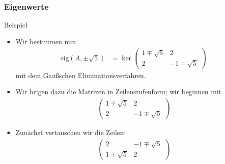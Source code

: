 \documentclass{beamer}
\renewcommand{\ae}{\"a}
\newcommand{\eig}{\mathrm{eig}}
\newcommand{\mytitle}{Eigenwerte}
\begin{document}
\begin{frame}\frametitle{\mytitle}
	\begin{block}{Beispiel}
	\begin{itemize}
		\item Wir bestimmen nun
			\begin{align*}
				\eig(A,\pm\sqrt 5)&=\ker\begin{pmatrix} 1\mp\sqrt 5&2\\2&-1\mp\sqrt 5 \end{pmatrix}
			\end{align*}
			mit dem Gau\ss schen Eliminationsverfahren.
		\item Wir brigen dazu die Matrizen in Zeilenstufenform; wir beginnen mit
			\begin{align*}
				\begin{pmatrix} 1\mp\sqrt 5&2\\2&-1\mp\sqrt 5 \end{pmatrix}
			\end{align*}
		\item Zun\ae chst vertauschen wir die Zeilen:
\begin{align*}
				\begin{pmatrix} 2&-1\mp\sqrt 5\\1\mp\sqrt 5&2 \end{pmatrix}
			\end{align*}
	\end{itemize}
	\end{block}
\end{frame}
\end{document}

